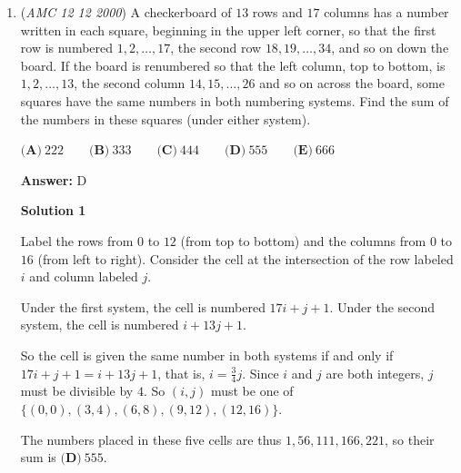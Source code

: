 \begin{enumerate}
\textbf{Solution 5}

Since we have $f(x/3)$, $f(3z)$ occurs at $x=9z.$ Thus, $f(9z/3) = f(3z) = (9z)^2 + 9z + 1$. We set this equal to 7:

 $81z^2 + 9z +1 = 7 \Longrightarrow 81z^2 + 9z - 6 = 0$. For any quadratic $ax^2 + bx +c = 0$, the sum of the roots is $-\frac{b}{a}$. Thus, the sum of the roots of this equation is $-\frac{9}{81} = \boxed{\textbf{(B) }-\frac19}$.

 


	\item (\textit{AMC 12 12 2000}) A checkerboard of $13$ rows and $17$ columns has a number written in each square, beginning in the upper left corner, so that the first row is numbered $1,2,\ldots,17$, the second row $18,19,\ldots,34$, and so on down the board. If the board is renumbered so that the left column, top to bottom, is $1,2,\ldots,13$, the second column $14,15,\ldots,26$ and so on across the board, some squares have the same numbers in both numbering systems. Find the sum of the numbers in these squares (under either system). 


 $\textbf {(A)}\ 222 \qquad \textbf {(B)}\ 333\qquad \textbf {(C)}\ 444 \qquad \textbf {(D)}\ 555 \qquad \textbf {(E)}\ 666$

 \textbf{Answer: }D



\textbf{Solution 1}

Label the rows from $0$ to $12$ (from top to bottom) and the columns from $0$ to $16$ (from left to right). Consider the cell at the intersection of the row labeled $i$ and column labeled $j$. 

 Under the first system, the cell is numbered $17i + j + 1$. Under the second system, the cell is numbered $i + 13j + 1$. 

 So the cell is given the same number in both systems if and only if $17i + j + 1 = i + 13j + 1$, that is, $i = \frac{3}{4}j$. Since $i$ and $j$ are both integers, $j$ must be divisible by $4$.  So $(i, j)$ must be one of $\{(0, 0), (3, 4), (6, 8), (9, 12), (12, 16)\}$.

 The numbers placed in these five cells are thus $1, 56, 111, 166, 221$, so their sum is $\boxed{\textbf{(D)}\ 555}$.

 



\end{enumerate}
